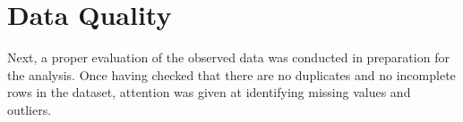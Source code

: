 \section{Data Quality}\label{sec:data_quality}
Next, a proper evaluation of the observed data was conducted in preparation for the analysis.
Once having checked that there are no duplicates and no incomplete rows in the dataset, 
attention was given at identifying missing values and outliers.






